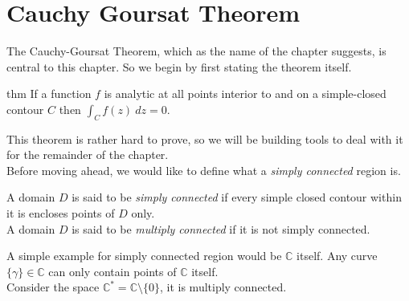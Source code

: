 \chapter{Cauchy Goursat Theorem}
The Cauchy-Goursat Theorem, which as the name of the chapter suggests, is central to this chapter. So we begin by first stating the theorem itself. 
\begin{restatable}{thm}{}\label{}
If a function $f$ is analytic at all points interior to and on a simple-closed contour $C$ then
	$\int_{{C}}^{{}} {f\left( z \right) } \: d{z} {} = 0$. 
\end{restatable}	
This theorem is rather hard to prove, so we will be building tools to deal with it for the remainder of the chapter.\\
Before moving ahead, we would like to define what a \emph{simply connected} region is.
\begin{defn}
A domain $D$ is said to be \emph{simply connected} if every simple closed contour within it is encloses points of $D$ only. \\
A domain $D$ is said to be \emph{multiply connected} if it is not simply connected. 
\end{defn}
A simple example for simply connected region would be $\mathds{C}$ itself. Any curve $\{\gamma\} \in \mathds{C}$ can only contain points of $\mathds{C}$ itself. \\
Consider the space $\mathds{C}^* = \mathds{C} \setminus \{0\} $, it is multiply connected.

\begin{center}
		 


	\end{center}

